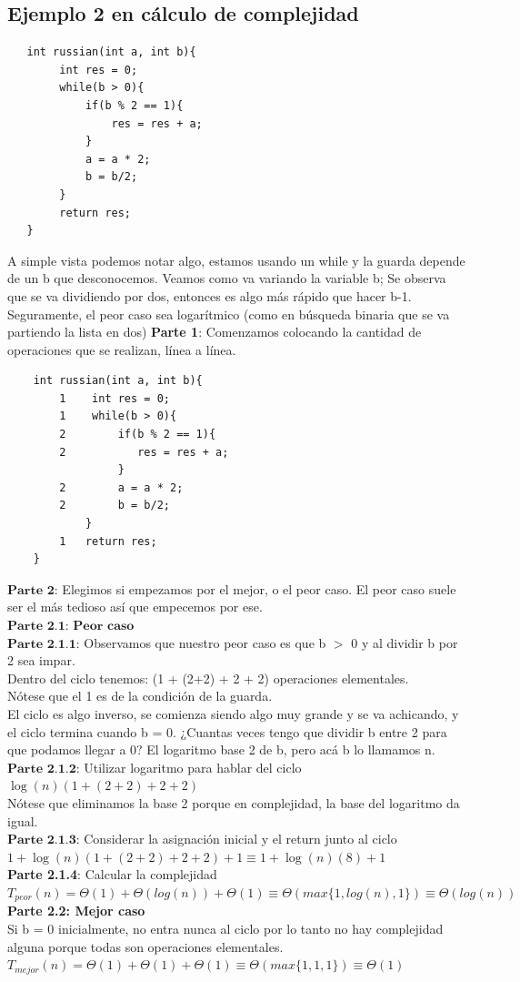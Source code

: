 \documentclass[10pt,a4paper]{article}
\begin{document}
\subsection*{Ejemplo 2 en cálculo de complejidad}
\begin{lstlisting}
   int russian(int a, int b){
        int res = 0;
        while(b > 0){
            if(b % 2 == 1){
                res = res + a;
            }
            a = a * 2;
            b = b/2;
        }
        return res;
   }
\end{lstlisting}
A simple vista podemos notar algo, estamos usando un while y la guarda depende de un b que desconocemos. Veamos como va variando la variable b; Se observa que se va dividiendo por dos, entonces es algo más rápido que hacer b-1. Seguramente, el peor caso sea logarítmico (como en búsqueda binaria que se va partiendo la lista en dos)
\newpage
\textbf{Parte 1}: Comenzamos colocando la cantidad de operaciones que se realizan, línea a línea. 
\begin{lstlisting}
    int russian(int a, int b){
        1    int res = 0;
        1    while(b > 0){
        2        if(b % 2 == 1){
        2           res = res + a;
                 }
        2        a = a * 2;
        2        b = b/2;
            }
        1   return res;
    }
 \end{lstlisting}
$\textbf{Parte 2}$: Elegimos si empezamos por el mejor, o el peor caso. El peor caso suele ser el más tedioso así que empecemos por ese. \\
$\textbf{Parte 2.1: Peor caso}$ \\
$\textbf{Parte 2.1.1}$: Observamos que nuestro peor caso es que b $>$ 0 y al dividir b por 2 sea impar. \\ Dentro del ciclo tenemos: (1 + (2+2) + 2 + 2) operaciones elementales. \\
Nótese que el 1 es de la condición de la guarda. \\ 
El ciclo es algo inverso, se comienza siendo algo muy grande y se va achicando, y el ciclo termina cuando b = 0. ¿Cuantas veces tengo que dividir b entre 2 para que podamos llegar a 0? El logaritmo base 2 de b, pero acá b lo llamamos n. \\ 
$\textbf{Parte 2.1.2}$: Utilizar logaritmo para hablar del ciclo \\
$\log(n)(1+(2+2) + 2 + 2)$ \\
Nótese que eliminamos la base 2 porque en complejidad, la base del logaritmo da igual.  \\
$\textbf{Parte 2.1.3}$: Considerar la asignación inicial y el return junto al ciclo \\ 
$1 + \log(n)(1+(2+2) + 2 + 2) + 1 \equiv 1 + \log(n)(8) + 1$ \\ 
\textbf{Parte 2.1.4}: Calcular la complejidad
$T_{peor}(n) = \Theta(1) + \Theta(log(n)) + \Theta(1) \equiv \Theta(max\{1, log(n), 1\}) \equiv \Theta(log(n)) $ \\
\textbf{Parte 2.2: Mejor caso} \\
Si b = 0 inicialmente, no entra nunca al ciclo por lo tanto no hay complejidad alguna porque todas son operaciones elementales. \\
$T_{mejor}(n) = \Theta(1) + \Theta(1) + \Theta(1) \equiv \Theta(max\{1, 1, 1\}) \equiv \Theta(1)$ \\
\end{document}
